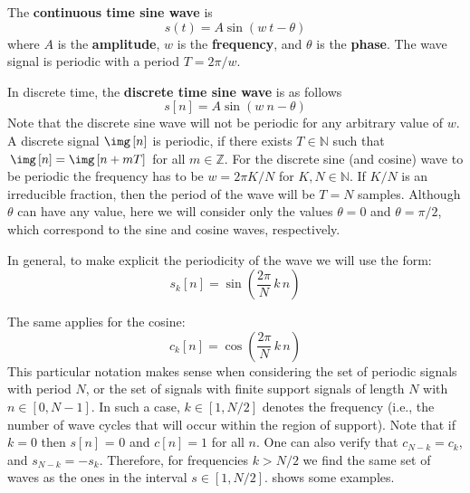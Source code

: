 
The {\bf continuous time sine wave} is
\begin{equation}
s\left(t\right) = A \sin\left(w ~t - \theta \right)
\end{equation}
where $A$ is the {\bf amplitude}, $w$ is the {\bf frequency}, and $\theta$ is the {\bf phase}. The wave signal is periodic with a period $T=2 \pi / w$. 


In discrete time, the {\bf discrete time sine wave} is as follows
\begin{equation}
s\left[n\right] = A \sin\left(w ~n  - \theta \right)
\end{equation}
Note that the discrete sine wave will not be periodic for any arbitrary value of $w$. A discrete signal $\img \left[n\right]$ is periodic, if there exists $T \in \mathbb{N}$ such that $\img \left[n\right] = \img \left[n+mT\right]$ for all $m \in \mathbb{Z}$. For the discrete sine (and cosine) wave to be periodic the frequency has to be $w = 2 \pi K / N$ for $K,N \in \mathbb{N}$. If $K/N$ is an irreducible fraction, then the period of the wave will be $T = N$ samples. Although $\theta$ can have any value, here we will consider only the values $\theta=0$ and $\theta = \pi/2$, which correspond to the sine and cosine waves, respectively. 


In general, to make explicit the periodicity of the wave we will use the form:
\begin{equation}
s_k\left[n\right] = \sin\left( \frac{2 \pi}{N} \, k \, n \right)
\end{equation}

The same applies for the cosine:
\begin{equation}
c_k\left[n\right] = \cos\left(\frac{2 \pi}{N} \,k\,n \right)
\end{equation}
This particular notation makes sense when considering the set of periodic signals with period $N$, or the set of signals with finite support signals of length $N$ with $n \in \left[0, N-1\right]$. In such a case, $k \in \left[1, N/2\right]$ denotes the frequency (i.e., the number of wave cycles that will occur within the region of support). Note that if $k=0$ then $s\left[n\right]$ = 0 and $c\left[n\right]=1$ for all $n$. One can also verify that $c_{N-k} = c_k$, and $s_{N-k} = -s_k$. Therefore, for frequencies $k>N/2$ we find the same set of waves as the ones in the interval $s \in \left[1, N/2\right]$. \Fig{\ref{fig:contsignal}} shows some examples. 

